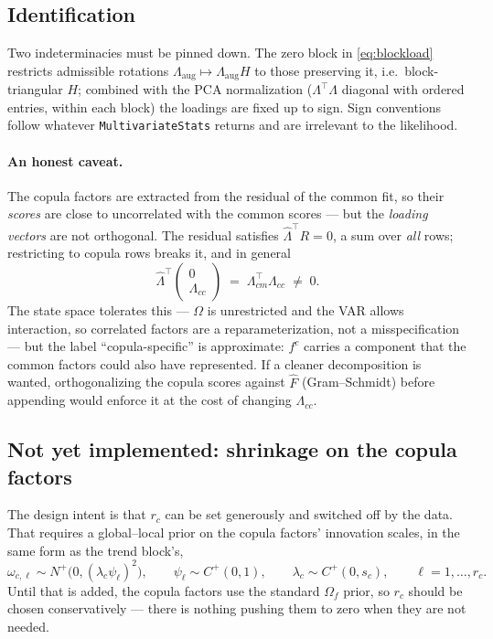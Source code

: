 \documentclass[11pt]{article}
\newcommand{\code}[1]{\texttt{#1}}
\begin{document}
\subsection{Identification}

Two indeterminacies must be pinned down. The zero block in
\eqref{eq:blockload} restricts admissible rotations $\Lambda_{\mathrm{aug}}
\mapsto \Lambda_{\mathrm{aug}} H$ to those preserving it, i.e.\ block-triangular
$H$; combined with the PCA normalization ($\Lambda^{\top}\Lambda$ diagonal with
ordered entries, within each block) the loadings are fixed up to sign. Sign
conventions follow whatever \code{MultivariateStats} returns and are irrelevant
to the likelihood.

\paragraph{An honest caveat.} The copula factors are extracted from the residual
of the common fit, so their \emph{scores} are close to uncorrelated with the
common scores --- but the \emph{loading vectors} are not orthogonal. The
residual satisfies $\hat\Lambda^{\top} R = 0$, a sum over \emph{all} rows;
restricting to copula rows breaks it, and in general
\begin{equation}
  \hat\Lambda^{\top} \begin{pmatrix} 0 \\ \Lambda_{cc} \end{pmatrix}
  \;=\; \Lambda_{cm}^{\top}\Lambda_{cc} \;\neq\; 0 .
\end{equation}
The state space tolerates this --- $\Omega$ is unrestricted and the VAR allows
interaction, so correlated factors are a reparameterization, not a
misspecification --- but the label ``copula-specific'' is approximate: $f^c$
carries a component that the common factors could also have represented. If a
cleaner decomposition is wanted, orthogonalizing the copula scores against
$\hat F$ (Gram--Schmidt) before appending would enforce it at the cost of
changing $\Lambda_{cc}$.

\subsection{Not yet implemented: shrinkage on the copula factors}

The design intent is that $r_c$ can be set generously and switched off by the
data. That requires a global--local prior on the copula factors' innovation
scales, in the same form as the trend block's,
\begin{equation}
  \omega_{c,\ell} \sim N^{+}\bigl(0, (\lambda_c \psi_\ell)^2\bigr), \qquad
  \psi_\ell \sim C^{+}(0,1), \qquad
  \lambda_c \sim C^{+}(0, s_c), \qquad \ell = 1,\ldots,r_c .
\end{equation}
Until that is added, the copula factors use the standard $\Omega_f$ prior, so
$r_c$ should be chosen conservatively --- there is nothing pushing them to zero
when they are not needed.
\end{document}
